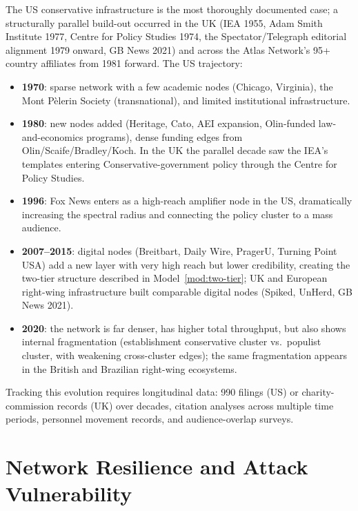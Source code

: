 \begin{example}
\label{ex:network-evolution}
The US conservative infrastructure is the most thoroughly documented case; a structurally parallel build-out occurred in the UK (IEA 1955, Adam Smith Institute 1977, Centre for Policy Studies 1974, the Spectator/Telegraph editorial alignment 1979 onward, GB News 2021) and across the Atlas Network's 95+ country affiliates from 1981 forward. The US trajectory:
\begin{itemize}[nosep]
  \item \textbf{1970}: sparse network with a few academic nodes (Chicago, Virginia), the Mont P\`{e}lerin Society (transnational), and limited institutional infrastructure.
  \item \textbf{1980}: new nodes added (Heritage, Cato, AEI expansion, Olin-funded law-and-economics programs), dense funding edges from Olin/Scaife/Bradley/Koch. In the UK the parallel decade saw the IEA's templates entering Conservative-government policy through the Centre for Policy Studies.
  \item \textbf{1996}: Fox News enters as a high-reach amplifier node in the US, dramatically increasing the spectral radius and connecting the policy cluster to a mass audience.
  \item \textbf{2007--2015}: digital nodes (Breitbart, Daily Wire, PragerU, Turning Point USA) add a new layer with very high reach but lower credibility, creating the two-tier structure described in Model~\ref{mod:two-tier}; UK and European right-wing infrastructure built comparable digital nodes (Spiked, UnHerd, GB News 2021).
  \item \textbf{2020}: the network is far denser, has higher total throughput, but also shows internal fragmentation (establishment conservative cluster vs.\ populist cluster, with weakening cross-cluster edges); the same fragmentation appears in the British and Brazilian right-wing ecosystems.
\end{itemize}
Tracking this evolution requires longitudinal data: 990 filings (US) or charity-commission records (UK) over decades, citation analyses across multiple time periods, personnel movement records, and audience-overlap surveys.
\end{example}


\section{Network Resilience and Attack Vulnerability}
\label{sec:ch15-resilience}

